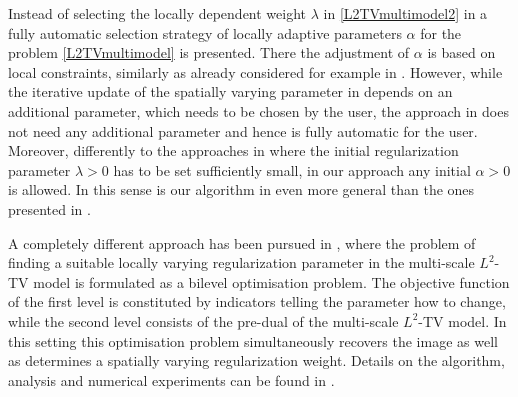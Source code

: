 \documentclass[enabledeprecatedfontcommands,cleardoublepage=empty,headsepline,twoside,11pt,DIV=15,BCOR=12mm,final]{scrartcl}
\begin{document}
Instead of selecting the locally dependent weight $\lambda$ in \eqref{L2TVmultimodel2} in  a fully automatic selection strategy of locally adaptive parameters $\alpha$ for the problem \eqref{L2TVmultimodel} is presented. There the adjustment of $\alpha$ is based on local constraints, similarly as already considered for example in \cite{AlBaCaHa:08,DoHiRi:11,HintermullerRincon-Camacho:10}. However, while the iterative update of the spatially varying parameter in \cite{AlBaCaHa:08,DoHiRi:11,HintermullerRincon-Camacho:10} depends on an additional parameter, which needs to be chosen by the user, the approach in  does not need any additional parameter and hence is fully automatic for the user. Moreover, differently to the approaches in \cite{DoHiRi:11,HintermullerRincon-Camacho:10} where the initial regularization parameter $\lambda>0$ has to be set sufficiently small, in our approach any initial $\alpha>0$ is allowed. In this sense is our algorithm in  even more general than the ones presented in \cite{DoHiRi:11,HintermullerRincon-Camacho:10}.


A completely different approach has been pursued in , where the problem of finding a suitable locally varying regularization parameter in the multi-scale $L^2$-TV model is formulated as a bilevel optimisation problem. The objective function of the first level is constituted by indicators telling the parameter how to change, while the second level consists of the pre-dual of the multi-scale $L^2$-TV model. In this setting this optimisation problem simultaneously recovers the image as well as determines a spatially varying regularization weight. Details on the algorithm, analysis and numerical experiments can be found in . 
\end{document}
